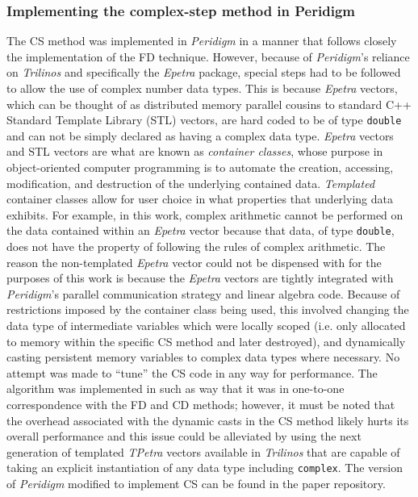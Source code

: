 \documentclass[preprint,12pt]{elsarticle}
\begin{document}
\subsubsection{Implementing the complex-step method in Peridigm} 
\label{subsubsec:Impl}
%
The CS method was implemented in \emph{Peridigm} in a manner that follows closely the implementation of the FD technique.  However, because of \emph{Peridigm}'s reliance on \emph{Trilinos} and specifically the \emph{Epetra} package, special steps had to be followed to allow the use of complex number data types.  This is because \emph{Epetra} vectors, which can be thought of as distributed memory parallel cousins to standard C++ Standard Template Library (STL) vectors, are hard coded to be of type {\tt double} and can not be simply declared as having a complex data type.  \emph{Epetra} vectors and STL vectors are what are known as \emph{container classes}, whose purpose in object-oriented computer programming is to automate the creation, accessing, modification,  and destruction of the underlying contained data.  \emph{Templated} container classes allow for user choice in what properties that underlying data exhibits.  For example, in this work, complex arithmetic cannot be performed on the data contained within an \emph{Epetra} vector because that data, of type {\tt double},  does not have the property of following the rules of complex arithmetic. The reason the non-templated \emph{Epetra} vector could not be dispensed with for the purposes of this work is because the \emph{Epetra} vectors are tightly integrated with \emph{Peridigm}'s parallel communication strategy and linear algebra code. Because of restrictions imposed by the container class being used, this involved changing the data type of intermediate variables which were locally scoped (i.e. only allocated to memory within the specific CS method and later destroyed), and dynamically casting persistent memory variables to complex data types where necessary. No attempt was made to ``tune'' the CS code in any way for performance. The algorithm  was implemented in such as way that it was in one-to-one correspondence with the FD and CD methods; however, it must be noted that the overhead associated with the dynamic casts in the CS method likely hurts its overall performance and this issue could be alleviated by using the next generation of templated \emph{TPetra} vectors available in \emph{Trilinos} that are capable of taking an explicit instantiation of any data type including {\tt complex}. The version of \emph{Peridigm} modified to implement CS can be found in the paper repository.  
\end{document}
